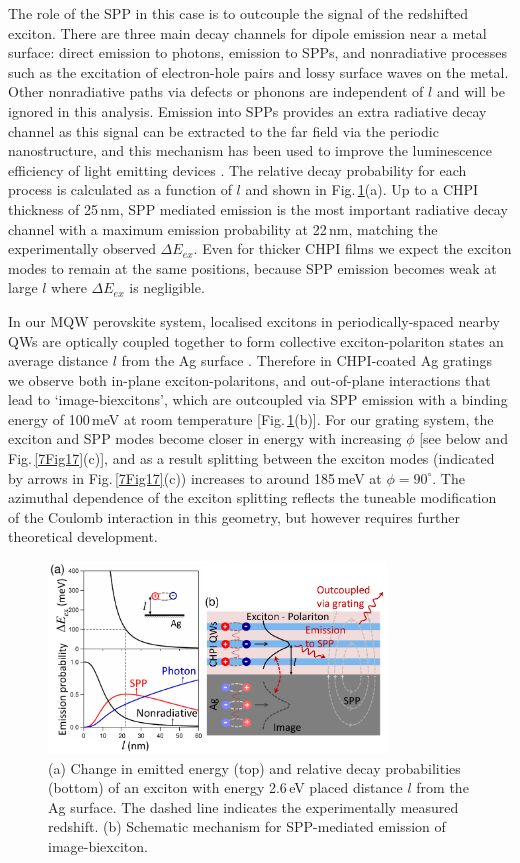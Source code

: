 The role of the SPP in this case is to outcouple the signal of the redshifted exciton. There are three main decay channels for dipole emission near a metal surface: direct emission to photons, emission to SPPs, and nonradiative processes such as the excitation of electron-hole pairs and lossy surface waves on the metal. Other nonradiative paths via defects or phonons are independent of $l$ and will be ignored in this analysis. Emission into SPPs provides an extra radiative decay channel as this signal can be extracted to the far field via the periodic nanostructure, and this mechanism has been used to improve the luminescence efficiency of light emitting devices \cite{Frischeisen2011, Kumar2012}. The relative decay probability for each process is calculated as a function of $l$ \cite{Ford1984} and shown in Fig.\,\ref{7Fig16}(a). Up to a CHPI thickness of 25\,nm, SPP mediated emission is the most important radiative decay channel with a maximum emission probability at 22\,nm, matching the experimentally observed $\Delta E_{ex}$. Even for thicker CHPI films we expect the exciton modes to remain at the same positions, because SPP emission becomes weak at large $l$ where $\Delta E_{ex}$ is negligible.

In our MQW perovskite system, localised excitons in periodically-spaced nearby QWs are optically coupled together to form collective exciton-polariton states an average distance $l$ from the Ag surface \cite{Pbbr2008, Baumberg1998, Kavokin1998, Vladimirova1998}. Therefore in CHPI-coated Ag gratings we observe both in-plane exciton-polaritons, and out-of-plane interactions that lead to `image-biexcitons', which are outcoupled via SPP emission with a binding energy of 100\,meV at room temperature [Fig.\,\ref{7Fig16}(b)]. For our grating system, the exciton and SPP modes become closer in energy with increasing $\phi$ [see below and Fig.\,\ref{7Fig17}(c)], and as a result splitting between the exciton modes (indicated by arrows in Fig.\,\ref{7Fig17}(c)) increases to around 185\,meV at $\phi=90^{\circ}$. The azimuthal dependence of the exciton splitting reflects the tuneable modification of the Coulomb interaction in this geometry, but however requires further theoretical development.
\begin{figure}[h!] 
\centering    
\includegraphics[width=0.8\textwidth]{Fig16}
\caption{(a) Change in emitted energy (top) and relative decay probabilities (bottom) of an exciton with energy 2.6\,eV placed distance $l$ from the Ag surface. The dashed line indicates the experimentally measured redshift. (b) Schematic mechanism for SPP-mediated emission of image-biexciton.}
\label{7Fig16}
\end{figure}

